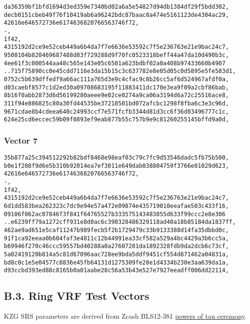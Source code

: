 \documentclass[
]{article}
\begin{document}
\begin{verbatim}
da36359bf1bfd1694d3ed359e7340bd02a6a5e54827d94db1384df29f5bdd302,
decb0151cbeb49f76f10419ab6a96242bdc87baac8a474e5161123de4304ac29,
42616e646572736e6174636820766563746f72,
-,
1f42,
4315192d2ce9e52ceb449a6b4da7f7e6636e53592c7f5e236763e21e9bac24c7,
9508104b820469687488d83f729288d9f70fc0523318beff44a47da10d490b3c,
4ee61f3c000544aa48c565e143e05c6501a623bdbf02a0a408b97433660b4907
..715f75890cc0e45cdd7116e3da15b15c3c637782e8e05d05c0d5895e5fe583d1,
0752c5b639dffedf9a66ac111a765d3e9c4cfac9c8b26cc5af6d524967afdf0a,
d03caebf8577c1d2ed30a09708683195f11883411dc170e3ea9f09a2cbf86bab,
8b16f0abb2873d6d56199280aeee9e02ce0274a9ca06a3194d6a72c25516ace8,
311f94e886825c80a30fd44535be37218501bd072afcbc1298f8fba6c3e3c96d,
9671cdae8b4cdeea640c24993ccf7e571fcfb3344d81d3cc6f36d03496777c1c,
624e25cd6eccec59b09f0893ef9eab877b55c757b9e9c81260255145bffd9a0d,
\end{verbatim}

\subsubsection{Vector 7}\label{vector-7-1}

\begin{verbatim}
35b877a25c394512292b82bdf8468e98eaf03c79c7fc9d53546dadc5fb75b500,
b0e1f208f9d6e5b310b92014ea7ef3011e649dab038804759f3766e01029d623,
42616e646572736e6174636820766563746f72,
-,
1f42,
4315192d2ce9e52ceb449a6b4da7f7e6636e53592c7f5e236763e21e9bac24c7,
6d1dd583bea262323c7dc9e94e57a472e09874e435719010eeafae503c433f16,
09106f062ac07846f3f841f64765527b333575143483855d633f99ccc2e8e306
..e6239ff79a1272cff931e8d0ac6c390328486329118ad40a18b85184da1837ff,
462ae9ad651e5caf11247b989fecb5f2b1729479c33b9133388d14fa35dbbd0c,
91f1ca92eeaa0b604faf3e4811c12b44991ea33cf582a529a4bc4429a3b6cc5a,
b69946f270c46ccc59557bd40288a0a27607281da1892328fdb9da2dcb6c73cf,
5a02419120b814a5c81d67096aac728ee9bda5ddf9451cf554d871462a04831a,
bd8c0c1e5e04577c8836e45fb64131d1275309fe28e1d4334b230e3aa639da1a,
d93ccbd393ed88c8165b0a01aabe28c56a53b43e527e7927eeadff006dd22114,
\end{verbatim}

\subsection{B.3. Ring VRF Test
Vectors}\label{b.3.-ring-vrf-test-vectors}

KZG SRS parameters are derived from Zcash BLS12-381
\href{https://zfnd.org/conclusion-of-the-powers-of-tau-ceremony}{powers
of tau ceremony}.
\end{document}
